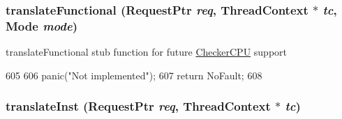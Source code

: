 \hypertarget{classAlphaISA_1_1TLB_a26658814c6c9034665aae19cf25545bb}{
\subsubsection[{translateFunctional}]{ translateFunctional ({\bf RequestPtr} {\em req}, \/  {\bf ThreadContext} $\ast$ {\em tc}, \/  {\bf Mode} {\em mode})}}
\label{classAlphaISA_1_1TLB_a26658814c6c9034665aae19cf25545bb}
translateFunctional stub function for future \hyperlink{classCheckerCPU}{CheckerCPU} support 


\begin{DoxyCode}
605 {
606     panic("Not implemented\n");
607     return NoFault;
608 }
\end{DoxyCode}
\hypertarget{classAlphaISA_1_1TLB_a072afd8ed455dade4c25a85510e5a4da}{
\subsubsection[{translateInst}]{ translateInst ({\bf RequestPtr} {\em req}, \/  {\bf ThreadContext} $\ast$ {\em tc})}}
\label{classAlphaISA_1_1TLB_a072afd8ed455dade4c25a85510e5a4da}



